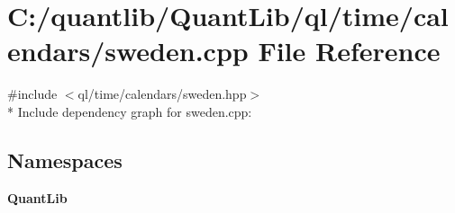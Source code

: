 \section{C\+:/quantlib/\+Quant\+Lib/ql/time/calendars/sweden.cpp File Reference}
\label{sweden_8cpp}
{\ttfamily \#include $<$ql/time/calendars/sweden.\+hpp$>$}\\*
Include dependency graph for sweden.\+cpp\+:
\subsection*{Namespaces}
\begin{DoxyCompactItemize}
\item 
 {\bf Quant\+Lib}
\end{DoxyCompactItemize}

